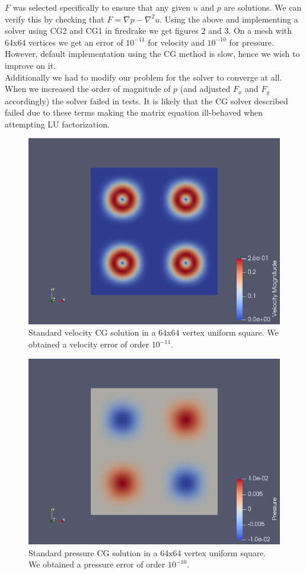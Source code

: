 \documentclass[11pt,twoside,a4paper]{article}
\begin{document}
$F$ was selected specifically to ensure that any given $u$ and $p$ are solutions. We can verify this by checking that $F = \nabla p - \nabla^2 u$.
Using the above and implementing a solver using CG2 and CG1 in firedrake we get figures 2 and 3. On a mesh with 64x64 vertices we get an error of $10^{-11}$ for velocity and $10^{-10}$ for pressure.\\
However, default implementation using the CG method is slow, hence we wish to improve on it.\\
Additionally we had to modify our problem for the solver to converge at all. When we increased the order of magnitude of $p$ (and adjusted $F_x$ and $F_y$ accordingly) the solver failed in tests. It is likely that the CG solver described failed due to these terms making the matrix equation ill-behaved  when attempting LU factorization.
\begin{figure}
  \includegraphics[width=\linewidth]{lgv.png}
  \caption{Standard velocity CG solution in a 64x64 vertex uniform square. We obtained a velocity error of order $10^{-11}$.}
\end{figure}
\begin{figure}
  \includegraphics[width=\linewidth]{lgp.png}
  \caption{Standard pressure CG solution in a 64x64 vertex uniform square. We obtained a pressure error of order $10^{-10}$.}
\end{figure}
\end{document}
